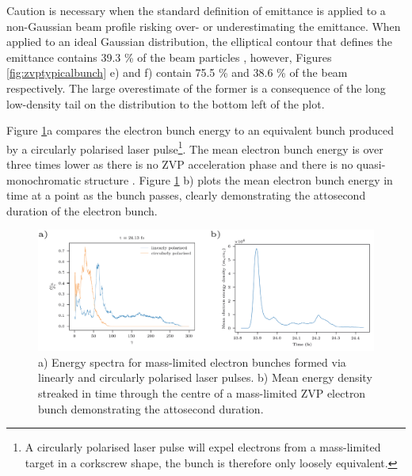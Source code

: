 Caution is necessary when the standard definition of emittance is applied to a non-Gaussian beam profile risking over- or underestimating the emittance. When applied to an ideal Gaussian distribution, the elliptical contour that defines the emittance contains 39.3 \% of the beam particles \cite{mcdonaldMethodsEmittanceMeasurement1989}, however, Figures \ref{fig:zvptypicalbunch} e) and f) contain 75.5 \% and 38.6 \% of the beam respectively. The large overestimate of the former is a consequence of the long low-density tail on the distribution to the bottom left of the plot.

Figure \ref{fig:zvptypicalbunchlines}a compares the electron bunch energy to an equivalent bunch produced by a circularly polarised laser pulse\footnote{A circularly polarised laser pulse will expel electrons from a mass-limited target in a corkscrew shape, the bunch is therefore only loosely equivalent.}. The mean electron bunch energy is over three times lower as there is no ZVP acceleration phase and there is no quasi-monochromatic structure \cite{baevaZeroVectorPotential2011}. Figure \ref{fig:zvptypicalbunchlines} b) plots the mean electron bunch energy in time at a point as the bunch passes, clearly demonstrating the attosecond duration of the electron bunch.
\begin{figure}
	\centering
	\includegraphics[width=1\linewidth]{figures/zvp/zvp_typical_bunch_lines}
	\caption[Energy spectra for mass-limited electron bunches formed via linearly and circularly polarised laser pulses.]{a) Energy spectra for mass-limited electron bunches formed via linearly and circularly polarised laser pulses. b) Mean energy density streaked in time through the centre of a mass-limited ZVP electron bunch demonstrating the attosecond duration.}
	\label{fig:zvptypicalbunchlines}
\end{figure}


